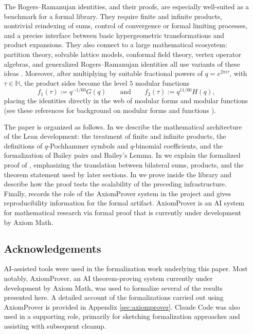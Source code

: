 \documentclass[12pt]{amsart}
\theoremstyle{definition}
\theoremstyle{remark}
\numberwithin{equation}{subsection}
\begin{document}
The Rogers--Ramanujan identities, and their proofs, are especially well-suited as a benchmark for a formal library.  They require finite and infinite products, nontrivial reindexing of sums, control of convergence or formal limiting processes, and a precise interface between basic hypergeometric transformations and product expansions.  They also connect to a large mathematical ecosystem: partition theory, solvable lattice models, conformal field theory, vertex operator algebras, and generalized Rogers--Ramanujan identities all use variants of these ideas \cite{AndrewsBook,BaxterBook,DMS,FLM,GasperRahman,KacIDA,LepowskyLi,GOW,SillsBook}.  Moreover, after multiplying by suitable fractional powers of $q=e^{2\pi i\tau}$, with $\tau\in\mathbb{H}$, the product sides become the level $5$ modular functions
\begin{equation}\label{RRnormalized}
f_1(\tau):=q^{-1/60}G(q)\qquad {\text {and}}\qquad  f_2(\tau):=q^{11/60}H(q),
\end{equation}
placing the identities directly in the web of modular forms and modular functions (see these references for background on modular forms and functions \cite{DiamondShurman,OnoCBMS,Schoeneberg,ZagierRR}).


The paper is organized as follows.  In  we describe the mathematical architecture of the Lean development: the treatment of finite and infinite products, the definitions of $q$-Pochhammer symbols and $q$-binomial coefficients, and the formalization of Bailey pairs and Bailey's Lemma.  In  we explain the formalized proof of , emphasizing the translation between bilateral sums, products, and the theorem statement used by later sections.  In  we prove  inside the library and describe how the proof tests the scalability of the preceding infrastructure.  Finally,  records the role of the AxiomProver system in the project and gives reproducibility information for the formal artifact. AxiomProver is an AI system for mathematical research via formal proof that is currently under development by Axiom Math.


\subsection*{Acknowledgements}

AI-assisted tools were used in the formalization work underlying this paper. Most notably, AxiomProver, an AI theorem-proving system currently under development by Axiom Math, was used to formalize several of the results presented here. A detailed account of the formalizations carried out using AxiomProver is provided in Appendix \ref{sec:axiomprover}. Claude Code was also used in a supporting role, primarily for sketching formalization approaches and assisting with subsequent cleanup.
\end{document}
